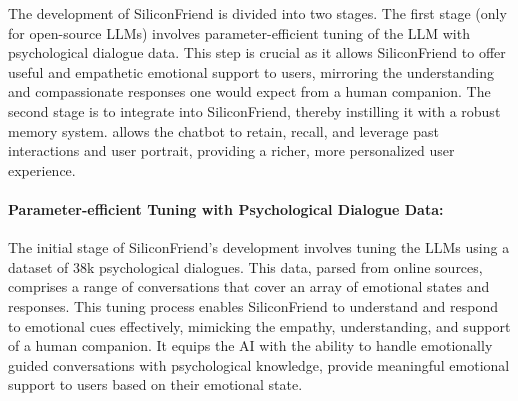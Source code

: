 
The development of SiliconFriend is divided into two stages.
The first stage (only for open-source LLMs) involves parameter-efficient tuning of the LLM with psychological dialogue data. 
This step is crucial as it allows SiliconFriend to offer useful and empathetic emotional support to users, mirroring the understanding and compassionate responses one would expect from a human companion.
The second stage is to integrate \method into SiliconFriend, thereby instilling it with a robust memory system. \method allows the chatbot to retain, recall, and leverage past interactions and user portrait, providing a richer, more personalized user experience.

\paragraph{Parameter-efficient Tuning with Psychological Dialogue Data:}
The initial stage of SiliconFriend's development involves tuning the LLMs using a dataset of 38k psychological dialogues. This data, parsed from online sources, comprises a range of conversations that cover an array of emotional states and responses. 
This tuning process enables SiliconFriend to understand and respond to emotional cues effectively, mimicking the empathy, understanding, and support of a human companion. It equips the AI with the ability to handle emotionally guided conversations with psychological knowledge, provide meaningful emotional support to users based on their emotional state.

